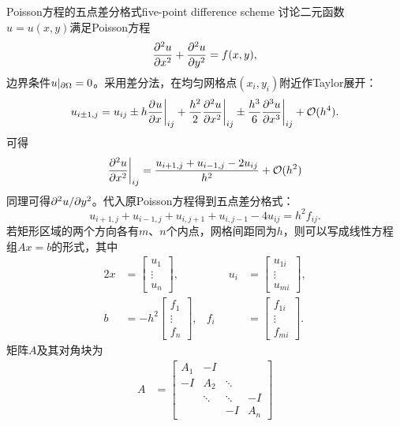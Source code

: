\begin{example}
    {Poisson方程的五点差分格式}{five-point difference scheme}
    讨论二元函数$u = u(x,y)$满足Poisson方程
    \begin{equation}\label{eq:na-poisson-equation}
        \pv[2]ux + \pv[2]uy = f(x,y),
    \end{equation}
    边界条件$u|_{\p\Omega} = 0$。采用差分法，在均匀网格点$(x_i,y_i)$附近作Taylor展开：
    \[
        u_{i\pm 1,j} = u_{ij} \pm h\biggeval{\pv ux}_{ij} + \frac{h^2}2\biggeval{\pv[2]ux}_{ij} \pm \frac{h^3}6\biggeval{\pv[3]ux}_{ij} + \bigo(h^4).
    \]
    可得
    \begin{equation}\label{eq:na-centered-second-difference}
        \biggeval{\pv[2]ux}_{ij} = \frac{u_{i+1,j} + u_{i-1,j} - 2u_{ij}}{h^2} + \bigo(h^2)
    \end{equation}
    同理可得$\p^2u/\p y^2$。代入原Poisson方程得到五点差分格式：
    \begin{equation}
        u_{i+1,j} + u_{i-1,j} + u_{i,j+1} + u_{i,j-1} - 4u_{ij} = h^2f_{ij}.
    \end{equation}
    若矩形区域的两个方向各有$m$、$n$个内点，网格间距同为$h$，则可以写成线性方程组$Ax = b$的形式，其中
    \begin{alignat*}{2}
        x &= \begin{bmatrix}u_1\\\vdots\\u_n\end{bmatrix},
        &\qquad u_i &= \begin{bmatrix}u_{1i}\\\vdots\\u_{mi}\end{bmatrix},\\
        b &= -h^2\begin{bmatrix}f_1\\\vdots\\f_n\end{bmatrix},
        & f_i &= \begin{bmatrix}f_{1i}\\\vdots\\f_{mi}\end{bmatrix}.
    \end{alignat*}
    矩阵$A$及其对角块为
    \begin{subequations}\label{eq:na-poisson-block-matrix}
        \begin{align}
            A &= \begin{bmatrix}
                A_1&-I\\-I&A_2&\ddots\\ &\ddots&\ddots&-I\\ &&-I&A_n

\end{bmatrix}
\end{align}
\end{subequations}
\end{example}
